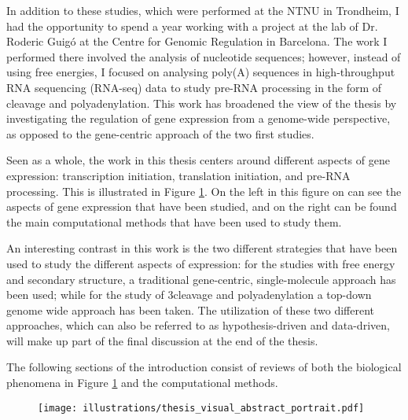 In addition to these studies, which were performed at the NTNU in Trondheim, I
had the opportunity to spend a year working with a project at the lab of Dr.
Roderic Guigó at the Centre for Genomic Regulation in Barcelona. The work I
performed there involved the analysis of nucleotide sequences; however, instead
of using free energies, I focused on analysing poly(A) sequences in
high-throughput RNA sequencing (RNA-seq) data to study pre-RNA processing in
the form of cleavage and polyadenylation. This work has broadened the view of
the thesis by investigating the regulation of gene expression from a
genome-wide perspective, as opposed to the gene-centric approach of the two
first studies.

Seen as a whole, the work in this thesis centers around different aspects of
gene expression: transcription initiation, translation initiation, and pre-RNA
processing. This is illustrated in Figure \ref{fig:thesis_visual}. On the left
in this figure on can see the aspects of gene expression that have been
studied, and on the right can be found the main computational methods that have
been used to study them.

An interesting contrast in this work is the two different strategies that have
been used to study the different aspects of expression: for the studies with
free energy and secondary structure, a traditional gene-centric,
single-molecule approach has been used; while for the study of 3\ppp cleavage
and polyadenylation a top-down genome wide approach has been taken. The
utilization of these two different approaches, which can also be referred to as
hypothesis-driven and data-driven, will make up part of the final discussion at
the end of the thesis.

The following sections of the introduction consist of reviews of both the
biological phenomena in Figure \ref{fig:thesis_visual} and the computational
methods.

\begin{figure}[htb]
	\begin{center}
		\texttt{[image: illustrations/thesis\_visual\_abstract\_portrait.pdf]}
	\end{center}
	\caption{}
	\label{fig:thesis_visual}
\end{figure}
